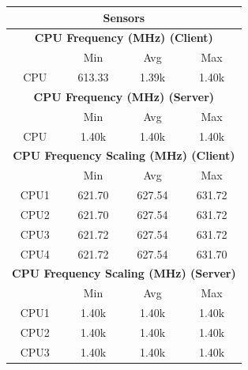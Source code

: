 \documentclass[11pt,a4paper]{scrreprt}
\begin{document}
\begin{table}[H]
\centering
    \begin{tabular}{||c|c|c|c|c|c|c||}
    \hline
    \multicolumn{7}{|c|}{\textbf{Sensors}} \\
    \hline
    \multicolumn{7}{|c|}{\textbf{CPU Frequency (MHz) (Client)}} \\
    \hline\hline
      & \multicolumn{2}{|c|}{Min} & \multicolumn{2}{|c|}{Avg} & \multicolumn{2}{|c|}{Max} \\
    \hline
    CPU & \multicolumn{2}{|c|}{613.33} & \multicolumn{2}{|c|}{1.39k} & \multicolumn{2}{|c|}{1.40k} \\
    \hline\hline
    \multicolumn{7}{|c|}{\textbf{CPU Frequency (MHz) (Server)}} \\
    \hline\hline
      & \multicolumn{2}{|c|}{Min} & \multicolumn{2}{|c|}{Avg} & \multicolumn{2}{|c|}{Max} \\
    \hline
    CPU & \multicolumn{2}{|c|}{1.40k} & \multicolumn{2}{|c|}{1.40k} & \multicolumn{2}{|c|}{1.40k} \\
    \hline\hline
    \multicolumn{7}{|c|}{\textbf{CPU Frequency Scaling (MHz) (Client)}} \\
    \hline
      & \multicolumn{2}{|c|}{Min} & \multicolumn{2}{|c|}{Avg} & \multicolumn{2}{|c|}{Max} \\
    \hline
    CPU1 & \multicolumn{2}{|c|}{621.70} & \multicolumn{2}{|c|}{627.54} & \multicolumn{2}{|c|}{631.72} \\
    \hline
    CPU2 & \multicolumn{2}{|c|}{621.70} & \multicolumn{2}{|c|}{627.54} & \multicolumn{2}{|c|}{631.72} \\
    \hline
    CPU3 & \multicolumn{2}{|c|}{621.72} & \multicolumn{2}{|c|}{627.54} & \multicolumn{2}{|c|}{631.72} \\
    \hline
    CPU4 & \multicolumn{2}{|c|}{621.72} & \multicolumn{2}{|c|}{627.54} & \multicolumn{2}{|c|}{631.70} \\
    \hline\hline
    \multicolumn{7}{|c|}{\textbf{CPU Frequency Scaling (MHz) (Server)}} \\
    \hline
      & \multicolumn{2}{|c|}{Min} & \multicolumn{2}{|c|}{Avg} & \multicolumn{2}{|c|}{Max} \\
    \hline
    CPU1 & \multicolumn{2}{|c|}{1.40k} & \multicolumn{2}{|c|}{1.40k} & \multicolumn{2}{|c|}{1.40k} \\
    \hline
    CPU2 & \multicolumn{2}{|c|}{1.40k} & \multicolumn{2}{|c|}{1.40k} & \multicolumn{2}{|c|}{1.40k} \\
    \hline
    CPU3 & \multicolumn{2}{|c|}{1.40k} & \multicolumn{2}{|c|}{1.40k} & \multicolumn{2}{|c|}{1.40k} \\

\end{tabular}
\end{table}
\end{document}
